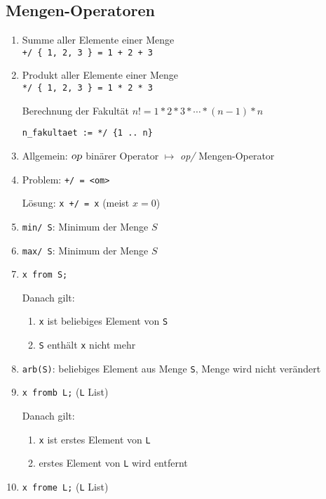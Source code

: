 \documentclass{article}
\begin{document}
\subsection{Mengen-Operatoren}
\begin{enumerate}
\item Summe aller Elemente einer Menge 
      \\[0.1cm]
      \hspace*{1.3cm}
      \texttt{+/ \{ 1, 2, 3 \} = 1 + 2 + 3}
\item Produkt aller Elemente einer Menge 
      \\[0.1cm]
      \hspace*{1.3cm}
      \texttt{*/ \{ 1, 2, 3 \} = 1 * 2 * 3}

      Berechnung der Fakult\"{a}t $n! = 1 * 2 * 3 * \cdots * (n-1) *n$

      \texttt{n\_fakultaet := */ \{1 .. n\}}
\item Allgemein: $\textsl{op}$ bin\"{a}rer Operator \quad $\mapsto$ \quad \textsl{op/} Mengen-Operator

\item Problem: \quad \texttt{+/{} = <om>}

      L\"{o}sung: \quad \texttt{x +/{} = x} \quad (meist $x = 0$)
\item \texttt{min/ S}: Minimum der Menge $S$
\item \texttt{max/ S}: Minimum der Menge $S$
\item \texttt{x from S;}

      Danach gilt:
      \begin{enumerate}
      \item \texttt{x} ist beliebiges Element von \texttt{S}
      \item \texttt{S} enth\"{a}lt \texttt{x} nicht mehr
      \end{enumerate}
\item \texttt{arb(S)}: beliebiges Element aus Menge \texttt{S}, Menge wird nicht ver\"{a}ndert
\item \texttt{x fromb L;} \quad (\texttt{L} List)

      Danach gilt:
      \begin{enumerate}
      \item \texttt{x} ist erstes Element von \texttt{L}
      \item erstes Element von \texttt{L} wird entfernt
      \end{enumerate}
\item \texttt{x frome L;} \quad (\texttt{L} List)


\end{enumerate}
\end{document}
